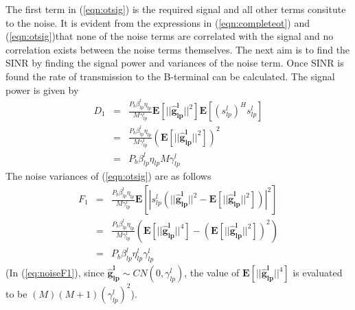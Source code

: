 \documentclass[10pt, a4paper, twoside,fleqn]{article}
\begin{document}
The first term in (\ref{eqn:otsig}) is the required signal and all other terms consitute to the noise. It is evident from the expressions in (\ref{eqn:completeot}) and (\ref{eqn:otsig})that none of the noise terms are correlated with the signal and no correlation exists between the noise terms themselves.
The next aim is to find the SINR by finding the signal power and variances of the noise term. Once SINR is found the rate of transmission to the B-terminal can be calculated.
The signal power is given by
\begin{eqnarray}
	D_1 &=& \frac{P_b\beta_{lp}^{l}\eta_{lp}}{M\gamma_{lp}^{l}}\mathbf{E}[||\mathbf{\hat  g_{lp}^{l}}||^2]\mathbf{E}[(s_{lp}^{l})^Hs_{lp}^{l}] \nonumber \\
            &=& \frac{P_b\beta_{lp}^{l}\eta_{lp}}{M\gamma_{lp}^{l}}(\mathbf{E}[||\mathbf{\hat g_{lp}^{l}}||^2])^2 \nonumber \\
            &=& P_b\beta_{lp}^{l}\eta_{lp}M\gamma_{lp}^{l}
\end{eqnarray}
The noise variances of (\ref{eqn:otsig}) are as follows
\begin{eqnarray}\label{eq:noiseF1}
	F_1 &=& \frac{P_b \beta_{lp}^{l} \eta_{lp}}{M\gamma_{lp}^{l}}   \mathbf{E}[|s_{lp}^{l}\left(||\mathbf{\hat g_{lp}^{l}}||^2- \mathbf{E}[||\mathbf{\hat  g_{lp}^{l}}||^2] \right)|^2] \nonumber \\
	    &=& \frac{P_b \beta_{lp}^{l} \eta_{lp}}{M\gamma_{lp}^{l}}   \left(\mathbf{E}[||\mathbf{\hat g_{lp}^{l}}||^4] - (\mathbf{E}[||\mathbf{\hat g_{lp}^{l}}||^2])^2 \right) \nonumber  \\
	    &=& P_b\beta_{lp}^{l}\eta_{lp}^{l}\gamma_{lp}^{l}
\end{eqnarray}
(In (\ref{eq:noiseF1}), since $\mathbf{\hat g_{lp}^{l}} \sim CN(0,\gamma_{lp}^{l})$, the value of $\mathbf{E}[||\mathbf{\hat g_{lp}^{l}}||^4]$ is evaluated to be $(M)(M+1)(\gamma_{lp}^{l})^2$).
\end{document}
